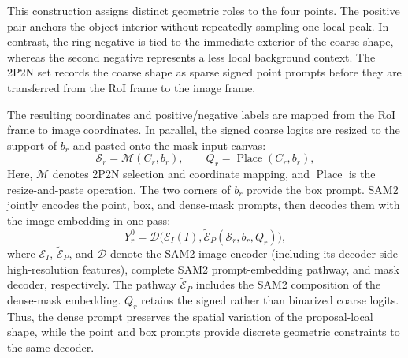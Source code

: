 \documentclass{article}
\begin{document}
This construction assigns distinct geometric roles to the four points. The
positive pair anchors the object interior without repeatedly sampling one local
peak. In contrast, the ring negative is tied to the immediate exterior of the
coarse shape, whereas the second negative represents a less local background
context. The 2P2N set records the coarse shape as sparse signed point prompts
before they are transferred from the RoI frame to the image frame.

The resulting coordinates and positive/negative labels are mapped from the
RoI frame to image coordinates. In parallel, the signed coarse logits are resized
to the support of $b_r$ and pasted onto the mask-input canvas:
\begin{equation}
\mathcal{S}_r=\mathcal{M}(C_r,b_r),\qquad
Q_r=\operatorname{Place}(C_r,b_r),
\label{eq:prompt-mining}
\end{equation}
Here, $\mathcal{M}$ denotes 2P2N selection and coordinate mapping, and
$\operatorname{Place}$ is the resize-and-paste operation. The two corners of
$b_r$ provide the box prompt. SAM2 jointly encodes the point, box, and
dense-mask prompts, then decodes them with the image embedding in one pass:
\begin{equation}
Y_r^0=\mathcal{D}\bigl(\mathcal{E}_I(I),
\widetilde{\mathcal{E}}_P(\mathcal{S}_r,b_r,Q_r)\bigr),
\label{eq:native-decoding}
\end{equation}
where $\mathcal{E}_I$, $\widetilde{\mathcal{E}}_P$, and $\mathcal{D}$ denote
the SAM2 image encoder (including its decoder-side high-resolution features),
complete SAM2 prompt-embedding pathway, and mask decoder, respectively.
The pathway $\widetilde{\mathcal{E}}_P$ includes the SAM2 composition of
the dense-mask embedding. $Q_r$ retains the signed rather than binarized
coarse logits. Thus, the dense prompt preserves the spatial variation of the
proposal-local shape, while the point and box prompts provide discrete
geometric constraints to the same decoder.
\end{document}
